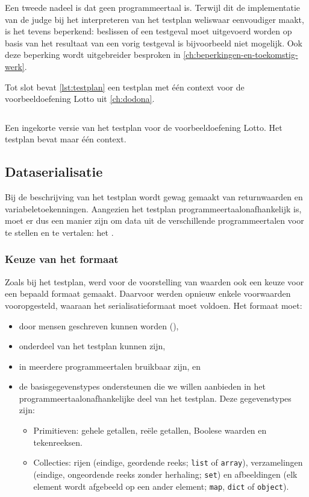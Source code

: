 Een tweede nadeel is dat  geen programmeertaal is.
Terwijl dit de implementatie van de judge bij het interpreteren van het testplan weliswaar eenvoudiger maakt, is het tevens beperkend: beslissen of een testgeval moet uitgevoerd worden op basis van het resultaat van een vorig testgeval is bijvoorbeeld niet mogelijk.
Ook deze beperking wordt uitgebreider besproken in \cref{ch:beperkingen-en-toekomstig-werk}.

Tot slot bevat \cref{lst:testplan} een testplan met één context voor de voorbeeldoefening Lotto uit \cref{ch:dodona}.

\begin{listing}
    \inputminted{python}{code/testplan.json}
    \caption{
        Een ingekorte versie van het testplan voor de voorbeeldoefening Lotto.
        Het testplan bevat maar één context.
    }
    \label{lst:testplan}
\end{listing}

\subsection{Dataserialisatie}\label{subsec:dataserialisatie}

Bij de beschrijving van het testplan wordt gewag gemaakt van returnwaarden en variabeletoekenningen.
Aangezien het testplan programmeertaalonafhankelijk is, moet er dus een manier zijn om data uit de verschillende programmeertalen voor te stellen en te vertalen: het .

\subsubsection{Keuze van het formaat}

Zoals bij het testplan, werd voor de voorstelling van waarden ook een keuze voor een bepaald formaat gemaakt.
Daarvoor werden opnieuw enkele voorwaarden vooropgesteld, waaraan het serialisatieformaat moet voldoen.
Het formaat moet:

\begin{itemize}
    \item door mensen geschreven kunnen worden (),
    \item onderdeel van het testplan kunnen zijn,
    \item in meerdere programmeertalen bruikbaar zijn, en
    \item de basisgegevenstypes ondersteunen die we willen aanbieden in het programmeertaalonafhankelijke deel van het testplan.
    Deze gegevenstypes zijn:
    \begin{itemize}
        \item Primitieven: gehele getallen, reële getallen, Boolese waarden en tekenreeksen.
        \item Collecties: rijen (eindige, geordende reeks; \texttt{list} of \texttt{array}), verzamelingen (eindige, ongeordende reeks zonder herhaling; \texttt{set}) en afbeeldingen (elk element wordt afgebeeld op een ander element; \texttt{map}, \texttt{dict} of \texttt{object}).
    \end{itemize}
\end{itemize}

